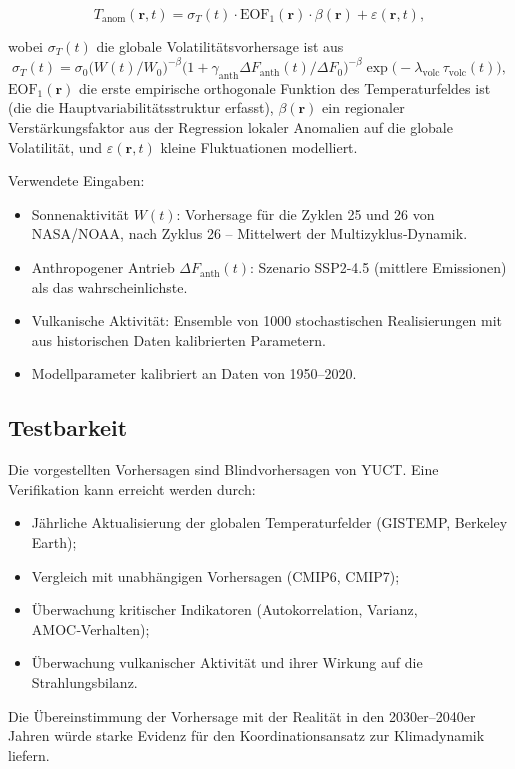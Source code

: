 \documentclass[12pt,a4paper]{article}
\begin{document}
	\[
	T_{\mathrm{anom}}(\mathbf{r},t) = \sigma_T(t) \cdot \mathrm{EOF}_1(\mathbf{r}) \cdot \beta(\mathbf{r}) + \varepsilon(\mathbf{r},t),
	\]
	
	wobei \(\sigma_T(t)\) die globale Volatilitätsvorhersage ist aus
	\[
	\sigma_T(t) = \sigma_0 \bigl( W(t)/W_0 \bigr)^{-\beta} \bigl(1 + \gamma_{\mathrm{anth}} \Delta F_{\mathrm{anth}}(t)/\Delta F_0\bigr)^{-\beta} \exp\!\bigl(-\lambda_{\text{volc}} \,\tau_{\text{volc}}(t)\bigr),
	\]
	\(\mathrm{EOF}_1(\mathbf{r})\) die erste empirische orthogonale Funktion des Temperaturfeldes ist (die die Hauptvariabilitätsstruktur erfasst), \(\beta(\mathbf{r})\) ein regionaler Verstärkungsfaktor aus der Regression lokaler Anomalien auf die globale Volatilität, und \(\varepsilon(\mathbf{r},t)\) kleine Fluktuationen modelliert.
	
	Verwendete Eingaben:
	\begin{itemize}
		\item Sonnenaktivität \(W(t)\): Vorhersage für die Zyklen 25 und 26 von NASA/NOAA, nach Zyklus 26 – Mittelwert der Multizyklus‑Dynamik.
		\item Anthropogener Antrieb \(\Delta F_{\mathrm{anth}}(t)\): Szenario SSP2-4.5 (mittlere Emissionen) als das wahrscheinlichste.
		\item Vulkanische Aktivität: Ensemble von 1000 stochastischen Realisierungen mit aus historischen Daten kalibrierten Parametern.
		\item Modellparameter kalibriert an Daten von 1950–2020.
	\end{itemize}
	
	\subsection{Testbarkeit}
	
	Die vorgestellten Vorhersagen sind Blindvorhersagen von YUCT. Eine Verifikation kann erreicht werden durch:
	\begin{itemize}
		\item Jährliche Aktualisierung der globalen Temperaturfelder (GISTEMP, Berkeley Earth);
		\item Vergleich mit unabhängigen Vorhersagen (CMIP6, CMIP7);
		\item Überwachung kritischer Indikatoren (Autokorrelation, Varianz, AMOC‑Verhalten);
		\item Überwachung vulkanischer Aktivität und ihrer Wirkung auf die Strahlungsbilanz.
	\end{itemize}
	Die Übereinstimmung der Vorhersage mit der Realität in den 2030er–2040er Jahren würde starke Evidenz für den Koordinationsansatz zur Klimadynamik liefern.
	
\end{document}
